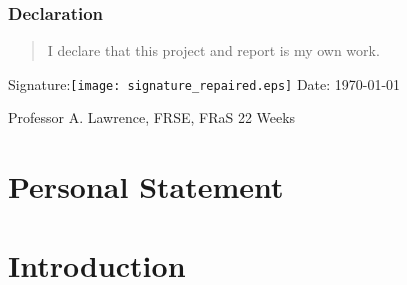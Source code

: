 \documentclass[a4paper,11pt]{article}
\begin{document}
\vspace*{1cm}

\subsubsection*{Declaration}
\begin{quotation}
  \noindent I declare that this project and report is my own work.
\end{quotation}

\hspace*{1cm}
Signature:\hspace*{1cm}\texttt{[image: signature\_repaired.eps]}
\hspace*{1cm}
Date: \today

\vfill
{} Professor A. Lawrence, FRSE, FRaS
\hfill
22 Weeks

\newpage
\thispagestyle{empty}
\section*{Personal Statement}\label{sec:personal_statement}
\lipsum[1]

\newpage
\thispagestyle{empty}
\tableofcontents

\newpage
\setcounter{page}{1} %
\section{Introduction}\label{sec:introduction}

\end{document}
